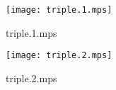 \documentclass[letterpaper,10pt]{article}
\begin{document}
\begin{figure}
    \centering
    \texttt{[image: triple.1.mps]}
    \caption{triple.1.mps}
\end{figure}

\begin{figure}
    \centering
    \texttt{[image: triple.2.mps]}
    \caption{triple.2.mps}
\end{figure}
\end{document}
